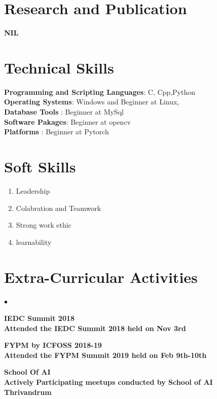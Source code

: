 \documentclass[margin,line]{res}
\newenvironment{list2}{
	\begin{list}{$\bullet$}{%
			\setlength{\itemsep}{0in}
			\setlength{\parsep}{0in} \setlength{\parskip}{0in}
			\setlength{\topsep}{0in} \setlength{\partopsep}{0in}
			\setlength{\leftmargin}{0.2in}}}{\end{list}}
\begin{document}
\begin{resume}
\section{\sc Research and Publication}

\bf NIL
\vspace{.1in}
\section{\sc Technical Skills}
{\bf Programming and Scripting Languages}:  C, Cpp,Python \\
{\bf Operating Systems}: Windows and Beginner at Linux,\\
{\bf Database Tools}  :  Beginner at MySql\\
{\bf Software Pakages}:  Beginner at opencv\\
{\bf Platforms}       : Beginner at Pytorch
\section{\sc Soft Skills}
\begin{enumerate} %
	\item Leadership 
	\item Colabration and Teamwork
	\item Strong work ethic 
	\item learnability 
\end{enumerate}

\section{\sc Extra-Curricular Activities}
\begin{list2} %
	\item \bf IEDC Summit 2018 \\
	Attended  the IEDC Summit 2018 held on Nov 3rd \\
	\item \bf FYPM by ICFOSS 2018-19\\
	Attended the FYPM Summit 2019 held on Feb 9th-10th 
	\item \bf School Of AI  \\
	Actively Participating meetups conducted by School of AI Thrivandrum
	
\end{list2}

\end{resume}
\end{document}
